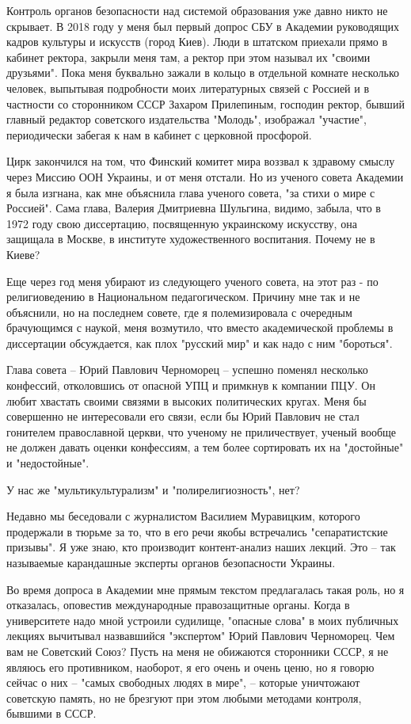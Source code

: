 Контроль органов безопасности над системой образования уже давно никто не
скрывает. В 2018 году у меня был первый допрос СБУ в Академии руководящих
кадров культуры и искусств (город Киев). Люди в штатском приехали прямо в
кабинет ректора, закрыли меня там, а ректор при этом называл их "своими
друзьями". Пока меня буквально зажали в кольцо в отдельной комнате несколько
человек, выпытывая подробности моих литературных связей с Россией и в частности
со сторонником СССР Захаром Прилепиным, господин ректор, бывший главный
редактор советского издательства "Молодь", изображал "участие", периодически
забегая к нам в кабинет с церковной просфорой.

Цирк закончился на том, что Финский комитет мира воззвал к здравому смыслу
через Миссию ООН Украины, и от меня отстали. Но из ученого совета Академии я
была изгнана, как мне объяснила глава ученого совета, "за стихи о мире с
Россией". Сама глава, Валерия Дмитриевна Шульгина, видимо, забыла, что в 1972
году свою диссертацию, посвященную украинскому искусству, она защищала в
Москве, в институте художественного воспитания. Почему не в Киеве?

Еще через год меня убирают из следующего ученого совета, на этот раз - по
религиоведению в Национальном педагогическом. Причину мне так и не объяснили,
но на последнем совете, где я полемизировала с очередным брачующимся с наукой,
меня возмутило, что вместо академической проблемы в диссертации обсуждается,
как плох "русский мир" и как надо с ним "бороться". 

Глава совета – Юрий Павлович Черноморец – успешно поменял несколько конфессий,
отколовшись от опасной УПЦ и примкнув к компании ПЦУ. Он любит хвастать своими
связями в высоких политических кругах. Меня бы совершенно не интересовали его
связи, если бы Юрий Павлович не стал гонителем православной церкви, что ученому
не приличествует, ученый вообще не должен давать оценки конфессиям, а тем более
сортировать их на "достойные" и "недостойные".

У нас же "мультикультурализм" и "полирелигиозность", нет?

Недавно мы беседовали с журналистом Василием Муравицким, которого продержали в
тюрьме за то, что в его речи якобы встречались "сепаратистские призывы". Я уже
знаю, кто производит контент-анализ наших лекций. Это – так называемые
карандашные эксперты органов безопасности Украины.

Во время допроса в Академии мне прямым текстом предлагалась такая роль, но я
отказалась, оповестив международные правозащитные органы. Когда в университете
надо мной устроили судилище, "опасные слова" в моих публичных лекциях вычитывал
назвавшийся "экспертом" Юрий Павлович Черноморец. Чем вам не Советский Союз?
Пусть на меня не обижаются сторонники СССР, я не являюсь его противником,
наоборот, я его очень и очень ценю, но я говорю сейчас о них – "самых свободных
людях в мире", – которые уничтожают советскую память, но не брезгуют при этом
любыми методами контроля, бывшими в СССР.

